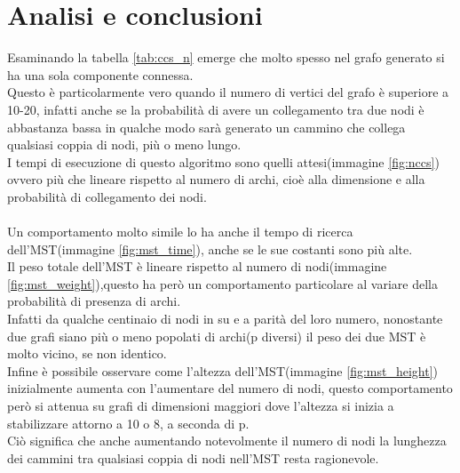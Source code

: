 \documentclass[]{article}
\begin{document}
\section{Analisi e conclusioni}
Esaminando la tabella \ref{tab:ccs_n} emerge che molto spesso nel grafo generato si ha una sola componente connessa.\\
Questo è particolarmente vero quando il numero di vertici del grafo è superiore a 10-20, infatti anche se la probabilità di avere un collegamento tra due nodi è abbastanza bassa in qualche modo sarà generato un cammino che collega qualsiasi coppia di nodi, più o meno lungo.\\
I tempi di esecuzione di questo algoritmo sono quelli attesi(immagine \ref{fig:nccs}) ovvero più che lineare rispetto al numero di archi, cioè alla dimensione e alla probabilità di collegamento dei nodi.\\
\\
Un comportamento molto simile lo ha anche il tempo di ricerca dell'MST(immagine \ref{fig:mst_time}), anche se le sue costanti sono più alte.\\
Il peso totale dell'MST è lineare rispetto al numero di nodi(immagine \ref{fig:mst_weight}),questo ha però un comportamento particolare al variare della probabilità di presenza di archi.\\
Infatti da qualche centinaio di nodi in su e a parità del loro numero, nonostante due grafi siano più o meno popolati di archi(p diversi) il peso dei due MST è molto vicino, se non identico.\\
Infine è possibile osservare come l'altezza dell'MST(immagine \ref{fig:mst_height}) inizialmente aumenta con l'aumentare del numero di nodi, questo comportamento però si attenua su grafi di dimensioni maggiori dove l'altezza si inizia a stabilizzare attorno a 10 o 8, a seconda di p.\\
Ciò significa che anche aumentando notevolmente il numero di nodi la lunghezza dei cammini  tra qualsiasi coppia di nodi nell'MST resta ragionevole.\\
 
\end{document}

